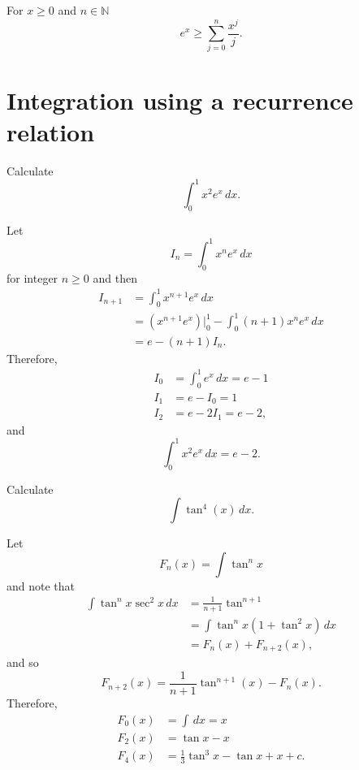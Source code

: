 \begin{lemma}
    For $x\geq0$ and $n\in\mathbb N$ \[e^x\geq\sum_{j=0}^n{\dfrac{x^j}{j}}.\]
\end{lemma}




\section{Integration using a recurrence relation}

\begin{example}
    Calculate \[\int_0^1x^2e^x\,dx.\]
    
    Let \[I_n=\int_0^1x^ne^x\,dx\] for integer $n\geq0$ and then
    \begin{align*}
        I_{n+1}&=\int_0^1x^{n+1}e^x\,dx\\
        &=(x^{n+1}e^x)\Big|^1_0-\int_0^1(n+1)x^{n}e^x\,dx\\
        &=e-(n+1)I_n.
    \end{align*}
    Therefore,
    \begin{align*}
        I_0&=\int_0^1e^x\,dx=e-1\\
        I_1&=e-I_0=1\\
        I_2&=e-2I_1=e-2,
    \end{align*}
    and \[\int_0^1x^2e^x\,dx=e-2.\]
\end{example}

\begin{example}
    Calculate \[\int\tan^4{(x)}\,dx.\]
    
    Let \[F_n(x)=\int\tan^n{x}\] and note that
    \begin{align*}
        \int\tan^n{x}\sec^2{x}\,dx&=\frac1{n+1}\tan^{n+1}\\
        &=\int\tan^n{x}(1+\tan^2{x})\,dx\\
        &=F_n(x)+F_{n+2}(x),
    \end{align*}
    and so \[F_{n+2}(x)=\frac1{n+1}\tan^{n+1}(x)-F_n(x).\] Therefore,
    \begin{align*}
        F_0(x)&=\int\,dx=x\\
        F_2(x)&=\tan{x} - x\\
        F_4(x)&=\frac13\tan^3{x}-\tan{x}+x+c.
    \end{align*}
\end{example}

